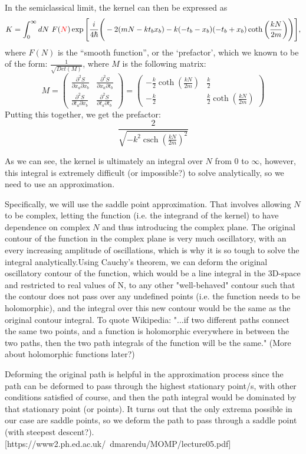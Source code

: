\documentclass[12pt]{revtex4}
\DeclareMathOperator{\csch}{csch}
\newcommand{\red}{\textcolor{red}}
\begin{document}
In the semiclassical limit, the kernel can then be expressed as 
\[ K=\int_{0}^{\infty} dN\ F(\red{N}) \exp \Bigg[\frac{i}{4 \hbar} \Bigg(-2 (m N - k t_b x_b) - k (-t_b - x_b) (-t_b + x_b) \coth\bigg(\frac{k N}{2 m}\bigg)\Bigg)\Bigg],\]
where $F(N)$ is the ``smooth function'', or the `prefactor', which we known to be of the form: $\frac{1}{\sqrt{Det(M)}}$, where $M$ is the following matrix:
\[ M=\begin{pmatrix}
\frac{\partial^2 S}{\partial x_a \partial x_b} & \frac{\partial^2 S}{\partial x_a \partial t_b} \\ 
\frac{\partial^2 S}{\partial t_a \partial x_b} & \frac{\partial^2 S}{\partial t_a \partial t_b} 
\end{pmatrix} = 
\begin{pmatrix}
-\frac{k}{2}  \coth(\frac{k N}{2 m}) & \frac{k}{2} \\ 
-\frac{k}{2} & \frac{k}{2} \coth(\frac{k N}{2 m})
\end{pmatrix} \]
Putting this together, we get the prefactor:
\[ \frac{2}{\sqrt{-k^2 \csch(\frac{k N}{2 m})^2}} \]

As we can see, the kernel is ultimately an integral over $N$ from 0 to $\infty$, however, this integral is extremely difficult (or impossible?) to solve analytically, so we need to use an approximation.

Specifically, we will use the saddle point approximation. That involves allowing $N$ to be complex, letting the function (i.e. the integrand of the kernel) to have dependence on complex $N$ and thus introducing the complex plane. The original contour of the function in the complex plane is very much oscillatory, with an every increasing amplitude of oscillations, which is why it is so tough to solve the integral analytically.Using Cauchy's theorem, we can deform the original oscillatory contour of the function, which would be a line integral in the 3D-space and restricted to real values of N, to any other "well-behaved" contour such that the contour does not pass over any undefined points (i.e. the function needs to be holomorphic), and the integral over this new contour would be the same as the original contour integral. To quote Wikipedia:  "...if two different paths connect the same two points, and a function is holomorphic everywhere in between the two paths, then the two path integrals of the function will be the same." (More about holomorphic functions later?) 

Deforming the original path is helpful in the approximation process since the path can be deformed to pass through the highest stationary point/s, with other conditions satisfied of course, and then the path integral would be dominated by that stationary point (or points). It turns out that the only extrema possible in our case are saddle points, so we deform the path to pass through a saddle point (with steepest descent?). [https://www2.ph.ed.ac.uk/~dmarendu/MOMP/lecture05.pdf]
\end{document}
